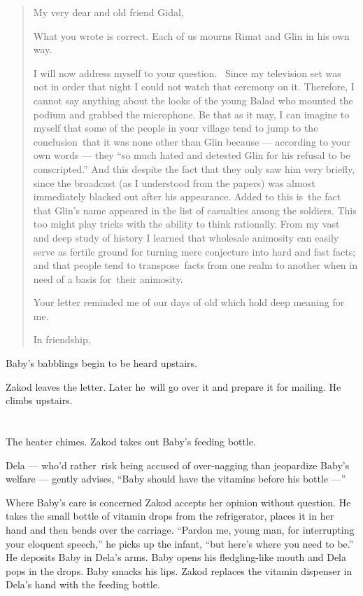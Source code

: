 \documentclass[twoside,11pt]{book}
\begin{document}
\begin{quotation}
My very dear and old friend Gidal,

What you wrote is correct. Each of us mourns Rimat and Glin in his own way.

I will now address myself to your question. ~Since my television set was not in order that night I could not watch that
ceremony on it. Therefore, I cannot say anything about the looks of the young Balad who mounted the podium and
grabbed the microphone. Be that as it may, I can imagine to myself that some of the people in your village tend to jump
to the conclusion~that it was none other than Glin because --- according to your own words --- they ``so
much hated and detested Glin for his refusal to be conscripted.'' And this despite the fact that they only
saw him very briefly, since the broadcast (as I understood from the papers) was almost immediately blacked out after
his appearance. Added to this is~the fact that Glin's name appeared in the list of casualties among the soldiers. This
too might play tricks with the ability to think rationally. From my vast and deep study of history I learned that
wholesale animosity can easily serve as fertile ground for turning mere conjecture into hard and fast facts; and that
people tend to transpose~facts from one realm to another when in need of a basis for~their animosity.

Your letter reminded me of our days of old which hold deep meaning for me.

In friendship,
\end{quotation}

Baby's babblings begin to be heard upstairs.

Zakod leaves the letter. Later he~will go over it and prepare it for mailing. He climbs upstairs.



\chapter{}

The heater chimes. Zakod takes out Baby's feeding bottle.

Dela --- who'd rather~risk being accused of over-nagging than jeopardize Baby's welfare --- gently advises,
``Baby should have the vitamins before his bottle ---''

Where Baby's care is concerned Zakod accepts her opinion without question. He takes the small bottle of vitamin drops
from the refrigerator, places it in her hand and then bends over the carriage. ``Pardon me, young man,
for interrupting your eloquent speech,'' he picks up the infant, ``but here's where you need to
be.'' He deposits Baby in Dela's arms. Baby opens his fledgling-like mouth and Dela pops in the drops.
Baby smacks his lips. Zakod replaces the vitamin dispenser in Dela's hand with the feeding bottle.
\end{document}
